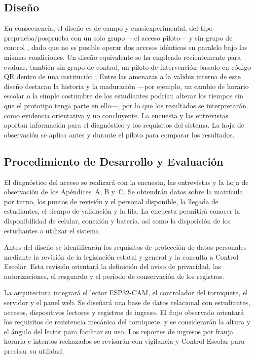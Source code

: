 \subsection{Diseño}
En consecuencia, el diseño es de campo y cuasiexperimental, del tipo
preprueba/posprueba con un solo grupo —el acceso piloto— y sin grupo de
control \parencite{campbellstanley1963, hernandezsampieri2014metodologia},
dado que no es posible operar dos accesos idénticos en paralelo bajo las
mismas condiciones. Un diseño equivalente se ha empleado recientemente para
evaluar, también sin grupo de control, un piloto de intervención basado en
código QR dentro de una institución \parencite{ortiz2026qrpilot}. Entre las
amenazas a la validez interna de este diseño destacan la historia y la
maduración \parencite{cranmer2017pretestposttest} —por ejemplo, un cambio de
horario escolar o la simple costumbre de los estudiantes podrían alterar los
tiempos sin que el prototipo tenga parte en ello—, por lo que los resultados
se interpretarán como evidencia orientativa y no concluyente. La encuesta y
las entrevistas aportan información para el diagnóstico y los requisitos del
sistema. La hoja de observación se aplica antes y durante el piloto para
comparar los resultados.

\subsection{Procedimiento de Desarrollo y Evaluación}
El diagnóstico del acceso se realizará con la encuesta, las entrevistas y la
hoja de observación de los Apéndices~A, B y~C. Se obtendrán datos sobre la
matrícula por turno, los puntos de revisión y el personal disponible, la
llegada de estudiantes, el tiempo de validación y la fila. La encuesta
permitirá conocer la disponibilidad de celular, conexión y batería, así como
la disposición de los estudiantes a utilizar el sistema.

Antes del diseño se identificarán los requisitos de protección de datos
personales mediante la revisión de la legislación estatal
\parencite{edomex2017datos} y general \parencite{lgpdppso2025} y la consulta a
Control Escolar. Esta revisión orientará la definición del aviso de
privacidad, las autorizaciones, el resguardo y el periodo de conservación de
los registros.

La arquitectura integrará el lector ESP32-CAM, el controlador del torniquete,
el servidor y el panel web. Se diseñará una base de datos relacional con
estudiantes, accesos, dispositivos lectores y registros de ingreso. El flujo
observado orientará los requisitos de resistencia mecánica del torniquete,
y se considerarán la altura y el ángulo del lector para facilitar su uso.
Los reportes de ingresos por franja horaria e intentos rechazados se
revisarán con vigilancia y Control Escolar para precisar su utilidad.

